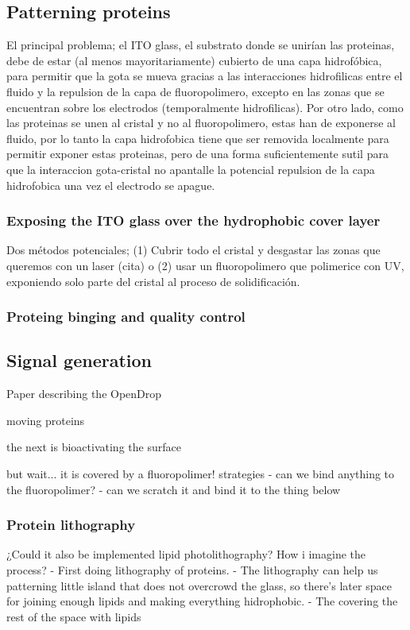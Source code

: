 \documentclass[10pt, twocolumn]{article}
\begin{document}
\subsection*{Patterning proteins}
El principal problema; el ITO glass, el substrato donde se unirían las proteinas, debe de estar (al menos mayoritariamente) cubierto de una capa hidrofóbica, para permitir que la gota se mueva gracias a las interacciones hidrofilicas entre el fluido y la repulsion de la capa de fluoropolimero, excepto en las zonas que se encuentran sobre los electrodos (temporalmente hidrofilicas). Por otro lado, como las proteinas se unen al cristal y no al fluoropolimero, estas han de exponerse al fluido, por lo tanto la capa hidrofobica tiene que ser removida localmente para permitir exponer estas proteinas, pero de una forma suficientemente sutil para que la interaccion gota-cristal no apantalle la potencial repulsion de la capa hidrofobica una vez el electrodo se apague.

\subsubsection*{Exposing the ITO glass over the hydrophobic cover layer}
Dos métodos potenciales; (1) Cubrir todo el cristal y desgastar las zonas que queremos con un laser (cita) o (2) usar un fluoropolimero que polimerice con UV, exponiendo solo parte del cristal al proceso de solidificación.
\subsubsection*{Proteing binging and quality control}
\subsection*{Signal generation}

Paper describing the OpenDrop

moving proteins

\cite{strale_multiprotein_2016}

the next is bioactivating the surface

but wait... it is covered by a fluoropolimer!
strategies
 - can we bind anything to the fluoropolimer?
  - can we scratch it and bind it to the thing below


\subsubsection*{Protein lithography}
¿Could it also be implemented lipid photolithography?
How i imagine the process?
 - First doing lithography of proteins. 
      - The lithography can help us patterning little island that does not overcrowd the glass, so there's later space for joining enough lipids and making everything hidrophobic.
 - The covering the rest of the space with lipids
\end{document}
